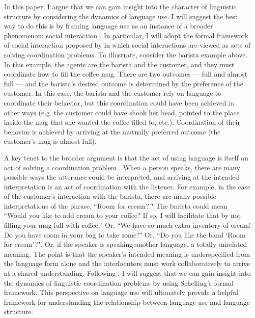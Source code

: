 \documentclass[man, noapacite, 12pt]{apa2}
\begin{document}
In this paper, I argue that we can gain  insight into the character of linguistic structure by considering the dynamics of language use. I will suggest the best way to do this is by framing language use as an instance of a broader phenomenon: social interaction \cite{clark1996using}. In particular, I will adopt the formal framework of social interaction proposed by  in which social interactions are viewed as acts of solving coordination problems.  To illustrate, consider the barista example above. In this example, the agents are the barista and the customer, and they must coordinate how  to fill the coffee mug. There are two outcomes --- full and almost full --- and the barista's desired outcome is determined by the preference of the customer. In this case, the barista and the customer rely on language to coordinate their behavior, but this coordination could have been achieved in other ways (e.g. the customer could have shook her head, pointed to the place inside the mug that she wanted the coffee filled to, etc.). Coordination of their behavior is achieved  by arriving at the mutually preferred outcome (the customer's mug is almost full).

A key tenet to the broader argument is that the act of using language is itself an act of solving a coordination problem \cite{clark1996using}. When a person speaks, there are many possible ways the utterance could be interpreted, and arriving at the intended interpretation is an act of coordination with the listener. For example, in the case of the customer's interaction with the barista, there are many possible interpretations of the phrase, ``Room for cream?." The barista could mean ``Would you like to add cream to your coffee? If so, I will facilitate that by not filling your mug full with coffee." Or, ``We have so much extra inventory of cream! Do you have room in your bag to take some?" Or, ``Do you like the band `Room for cream'?". Or, if the speaker is speaking another language, a totally unrelated meaning. The point is that the speaker's intended meaning is underspecified from the language form alone and the interlocutors must work collaboratively to arrive at a shared understanding. Following , I will suggest that we can gain insight into the dynamics of linguistic coordination problems by using Schelling's formal framework.  This perspective on language use will ultimately provide a helpful framework for understanding the relationship between language use and language structure.
\end{document}
